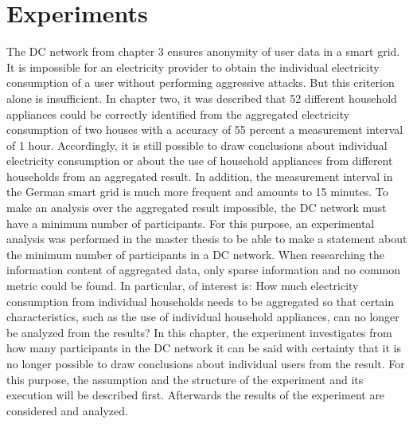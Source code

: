 \chapter{Experiments}
\label{sec:experiments}


The DC network from chapter 3 ensures anonymity of user data in a smart grid. It is impossible for an electricity provider to obtain the individual electricity consumption of a user without performing aggressive attacks. But this criterion alone is insufficient. In chapter two, it was described that 52 different household appliances could be correctly identified from the aggregated electricity consumption of two houses with a accuracy of 55 percent a measurement interval of 1 hour. Accordingly, it is still possible to draw conclusions about individual electricity consumption or about the use of household appliances from different households from an aggregated result. In addition, the measurement interval in the German smart grid is much more frequent and amounts to 15 minutes. To make an analysis over the aggregated result impossible, the DC network must have a minimum number of participants. For this purpose, an experimental analysis was performed in the master thesis to be able to make a statement about the minimum number of participants in a DC network. When researching the information content of aggregated data, only sparse information and no common metric could be found. In particular, of interest is: How much electricity consumption from individual households needs to be aggregated so that certain characteristics, such as the use of individual household appliances, can no longer be analyzed from the results? In this chapter, the experiment investigates from how many participants in the DC network it can be said with certainty that it is no longer possible to draw conclusions about individual users from the result. For this purpose, the assumption and the structure of the experiment and its execution will be described first. Afterwards the results of the experiment are considered and analyzed.
